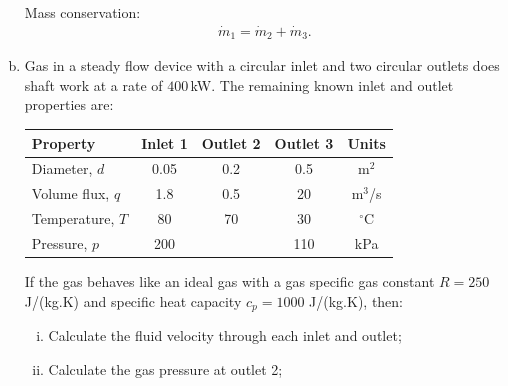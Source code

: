 \documentclass[calculator,steamtables,refrigeranttables,psychrometricchart,datasheet,solutions]{exam}
\begin{document}
\begin{question}
\begin{enumerate}[(a)]
{Mass conservation:
\begin{align*}
 \dot{m}_1 = \dot{m}_2 + \dot{m}_3.
\end{align*}
}

\item Gas in a steady flow device with a circular inlet and two circular outlets does shaft work at a rate of $400$\,kW. The remaining known inlet and outlet properties are: 
\begin{center}
\begin{tabular}{|l |c |c |c |c |}
\hline
Property            & Inlet 1 & Outlet 2 & Outlet 3 & Units       \\
\hline
Diameter, $d$       & 0.05    & 0.2      & 0.5      & m$^{2}$     \\
Volume flux, $q$    & 1.8     & 0.5      & 20       & m$^{3}$/s   \\
Temperature, $T$    & 80      & 70       & 30       & $^{\circ}$C \\
Pressure, $p$       & 200     &          & 110      & kPa         \\
\hline 
\end{tabular}
\end{center}
If the gas behaves like an ideal gas with a gas specific gas constant $R=250$\,J/(kg.K) and specific heat capacity $c_{p}=1000$ J/(kg.K), then:
\begin{enumerate}[(i)]
\item Calculate the fluid velocity through each inlet and outlet; 

\item Calculate the gas pressure at outlet 2; 
\end{enumerate}
\end{enumerate}
\end{question}
\end{document}
